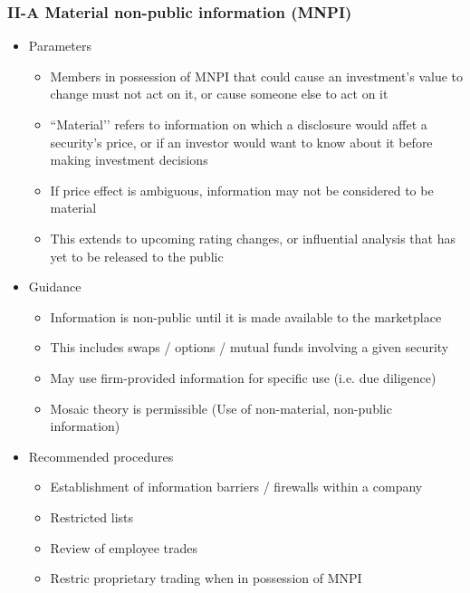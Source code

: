 \documentclass[../notes_compiled.tex]{subfiles}
\begin{document}
\subsubsection{II-A Material non-public information (MNPI)}
\begin{itemize}
\item Parameters
\begin{itemize}
\item Members in possession of MNPI that could cause an investment’s value to change must not act on it, or cause someone else to act on it
\item ``Material’’ refers to information on which a disclosure would affet a security’s price, or if an investor would want to know about it before making investment decisions
\item If price effect is ambiguous, information may not be considered to be material
\item This extends to upcoming rating changes, or influential analysis that has yet to be released to the public
\end{itemize}
\item Guidance
\begin{itemize}
\item Information is non-public until it is made available to the marketplace
\item This includes swaps / options / mutual funds involving a given security
\item May use firm-provided information for specific use (i.e. due diligence)
\item Mosaic theory is permissible (Use of non-material, non-public information)
\end{itemize}
\item Recommended procedures
\begin{itemize}
\item Establishment of information barriers / firewalls within a company
\item Restricted lists
\item Review of employee trades
\item Restric proprietary trading when in possession of MNPI
\end{itemize}
\end{itemize}
\end{document}
